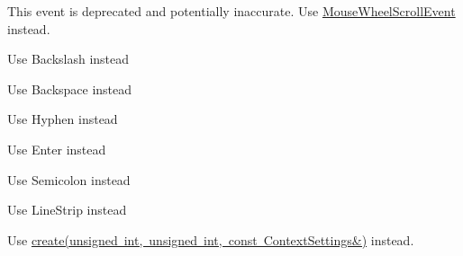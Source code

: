 
\begin{DoxyRefList}
\item[Class \mbox{\hyperlink{structsf_1_1_event_1_1_mouse_wheel_event}{sf\+::Event\+::Mouse\+Wheel\+Event}} ]\label{deprecated__deprecated000018}%
%
This event is deprecated and potentially inaccurate. Use \mbox{\hyperlink{structsf_1_1_event_1_1_mouse_wheel_scroll_event}{Mouse\+Wheel\+Scroll\+Event}} instead. 
\item[Member \mbox{\hyperlink{classsf_1_1_keyboard_acb4cacd7cc5802dec45724cf3314a142a536df84e73859aa44e11e192459470b6}{sf\+::Keyboard\+::Back\+Slash}} ]\label{deprecated__deprecated000021}%
%
Use Backslash instead  
\item[Member \mbox{\hyperlink{classsf_1_1_keyboard_acb4cacd7cc5802dec45724cf3314a142a33aeaab900abcd01eebf2fcc4f6d97e2}{sf\+::Keyboard\+::Back\+Space}} ]\label{deprecated__deprecated000020}%
%
Use Backspace instead  
\item[Member \mbox{\hyperlink{classsf_1_1_keyboard_acb4cacd7cc5802dec45724cf3314a142a401a183dcfde0a06cb60fe6c91fa1e39}{sf\+::Keyboard\+::Dash}} ]\label{deprecated__deprecated000019}%
%
Use Hyphen instead  
\item[Member \mbox{\hyperlink{classsf_1_1_keyboard_acb4cacd7cc5802dec45724cf3314a142ac291de81bdee518d636bc359f2ca77de}{sf\+::Keyboard\+::Return}} ]\label{deprecated__deprecated000023}%
%
Use Enter instead  
\item[Member \mbox{\hyperlink{classsf_1_1_keyboard_acb4cacd7cc5802dec45724cf3314a142a460ab09a36f9ed230504b89b9815de88}{sf\+::Keyboard\+::Semi\+Colon}} ]\label{deprecated__deprecated000022}%
%
Use Semicolon instead  
\item[Member \mbox{\hyperlink{group__graphics_gga5ee56ac1339984909610713096283b1ba5b09910f5d0f39641342184ccd0d1de3}{sf\+::Lines\+Strip}} ]\label{deprecated__deprecated000001}%
%
Use Line\+Strip instead  
\item[Member \mbox{\hyperlink{classsf_1_1_render_texture_aaec1fb8ee77844da50b0143cb41c8a71}{sf\+::Render\+Texture\+::create}} (unsigned int width, unsigned int height, bool depth\+Buffer)]\label{deprecated__deprecated000004}%
%
Use \mbox{\hyperlink{classsf_1_1_render_texture_a49b7b723a80f89bc409a942364351dc3}{create(unsigned int, unsigned int, const Context\+Settings\&)}} instead. 

\end{DoxyRefList}
